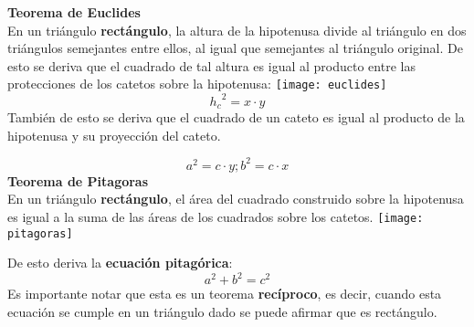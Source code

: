 \textbf{Teorema de Euclides}\\
En un triángulo \textbf{rectángulo}, la altura de la hipotenusa divide al triángulo en dos triángulos semejantes entre ellos, al igual que semejantes al triángulo original. De esto se deriva que el cuadrado de tal altura es igual al producto entre las protecciones de los catetos sobre la hipotenusa:
\texttt{[image: euclides]}
\begin{equation*}
{h_c}^2 = x \cdot y
\end{equation*}
También de esto se deriva que el cuadrado de un cateto es igual al producto de la hipotenusa y su proyección del cateto.

\begin{equation*}
    a^2 = c \cdot y; b^2 = c \cdot x
\end{equation*}
\textbf{Teorema de Pitagoras}\\
En un triángulo \textbf{rectángulo}, el área del cuadrado construido sobre la hipotenusa es igual a la suma de las áreas de los cuadrados sobre los catetos.
\texttt{[image: pitagoras]}

De esto deriva la \textbf{ecuación pitagórica}:
\begin{equation*}
    a^2 + b^2 = c^2
\end{equation*}
Es importante notar que esta es un teorema \textbf{recíproco}, es decir, cuando esta ecuación se cumple en un triángulo dado se puede afirmar que es rectángulo.\\
